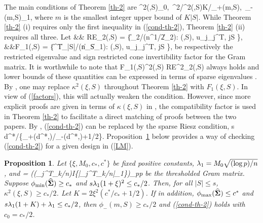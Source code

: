 \documentclass[11pt]{amsart}
\newtheorem{proposition}{Proposition}
\begin{document}
The main conditions of Theorem \ref{th-2} are 
\kappa^2(\xi,S)_0,\ 
\xi^2/\kappa^2(\xi,S)\le K/\phi_+(m,S),\ \phi_-(m,S)_1, 
\eel 
where $m$ is the smallest integer upper bound of $K|S|$. 
While Theorem \ref{th-2} (i) requires only the first inequality in (\ref{cond-th-2}), 
Theorem \ref{th-2} (ii) requires all three.  Let 
\bes
&& RE_2(\xi,S) = \inf\big\{\|\bX\bu\|_2/(n^{1/2}\|\bu\|_2):  
\bu\in\scrC(\xi,S), u_j\bx_j^T\bX\bu{}, j\notin S \big\}, 
\cr &&F_1(\xi,S) = \inf\big\{\|\bX^T\bX\bu\|_\infty|S|/(n\|\bu_S\|_1):  
\bu\in\scrC(\xi,S), u_j\bx_j^T\bX\bu\le 0, j\notin S \big\}, 
\ees
be respectively the restricted eigenvalue and sign restricted cone invertibility factor for the 
Gram matrix. It is worthwhile to note that 
F_1(\xi,S)\ge \kappa^2(\xi,S) \ge RE^2_2(\xi,S)
\eel
always holds and lower bounds of these quantities can be expressed in terms of sparse eigenvalues \cite{YeZ10}. 
By \cite{SunZ11}, one may replace $\kappa^2(\xi,S)$ throughout Theorem \ref{th-2} with $F_1(\xi,S)$. 
In view of (\ref{factors}), this will actually weaken the condition. 
However, since more explicit proofs are given in terms of $\kappa(\xi,S)$ in \cite{SunZ11}, 
the compatibility factor is used in Theorem \ref{th-2} to facilitate {a direct matching} of proofs 
between the two papers.%
By \cite{ZhangH08,Zhang10-mc+,HuangZ12},  (\ref{cond-th-2}) can be replaced by 
the sparse Riesz condition,  
s \le d^*/\{\phi_+(d^*,\emptyset)/\phi_-(d^*,\emptyset)+1/2\}. 
\eel
Proposition~\ref{prop-2} below provides a way of 
checking (\ref{cond-th-2}) for a given design in (\ref{LM}). 

\begin{proposition}\label{prop-2} 
Let $\{\xi,M_0,{c}_*,c^*\}$ be fixed positive constants, $\lambda_1 = M_0\sqrt{(\log p)/n}$,  and 
\bes
\hbSigma = \Big((\bx_j^T\bx_k/n)I\{|\bx_j^T\bx_k/n|\ge\lam_1\}\Big)_{p\times p}
\ees
be the thresholded Gram matrix. 
Suppose $\phi_{\min}({\widehat{\boldsymbol{\Sigma}}})\ge {c}_*$ and $s\lambda_1(1+\xi)^2 \le {c}_*/2$. 
Then, for all $|S|\le s$, $\kappa^2(\xi,S)\ge {c}_*/2$. 
Let $K = 2\xi^2(c^*/{c}_*+1/2)$. 
If in addition, $\phi_{\max}({\widehat{\boldsymbol{\Sigma}}})\le c^*$ and $s\lambda_1(1+K)+\lambda_1 \le {c}_*/2$, then 
$\phi_-(m,S)\ge {c}_*/2$ and (\ref{cond-th-2}) holds with ${c}_0={c}_*/2$. 
\end{proposition}
\end{document}
